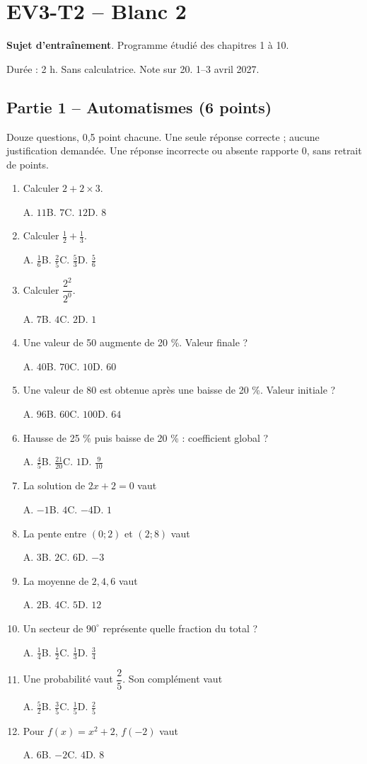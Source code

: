 \clearpage\section*{EV3-T2 -- Blanc 2}\label{EV3-T2}
\textbf{Sujet d’entraînement}. Programme étudié des chapitres 1 à 10.\par Durée : 2 h. Sans calculatrice. Note sur 20. 1–3 avril 2027.
\subsection*{Partie 1 -- Automatismes (6 points)}
Douze questions, 0,5 point chacune. Une seule réponse correcte ; aucune justification demandée. Une réponse incorrecte ou absente rapporte 0, sans retrait de points.
\begin{enumerate}
\item Calculer $2+2\times3$.\par A. $11$\quad B. $7$\quad C. $12$\quad D. $8$
\item Calculer $\frac12+\frac13$.\par A. $\frac{1}{6}$\quad B. $\frac{2}{5}$\quad C. $\frac{5}{3}$\quad D. $\frac{5}{6}$
\item Calculer $\dfrac{2^2}{2^{0}}$.\par A. $7$\quad B. $4$\quad C. $2$\quad D. $1$
\item Une valeur de 50 augmente de 20 \%. Valeur finale ?\par A. $40$\quad B. $70$\quad C. $10$\quad D. $60$
\item Une valeur de 80 est obtenue après une baisse de 20 \%. Valeur initiale ?\par A. $96$\quad B. $60$\quad C. $100$\quad D. $64$
\item Hausse de 25 \% puis baisse de 20 \% : coefficient global ?\par A. $\frac{4}{5}$\quad B. $\frac{21}{20}$\quad C. $1$\quad D. $\frac{9}{10}$
\item La solution de $2x+2=0$ vaut\par A. $-1$\quad B. $4$\quad C. $-4$\quad D. $1$
\item La pente entre $(0;2)$ et $(2;8)$ vaut\par A. $3$\quad B. $2$\quad C. $6$\quad D. $-3$
\item La moyenne de $2, 4, 6$ vaut\par A. $2$\quad B. $4$\quad C. $5$\quad D. $12$
\item Un secteur de $90^\circ$ représente quelle fraction du total ?\par A. $\frac{1}{4}$\quad B. $\frac{1}{2}$\quad C. $\frac{1}{3}$\quad D. $\frac{3}{4}$
\item Une probabilité vaut $\dfrac{2}{5}$. Son complément vaut\par A. $\frac{5}{2}$\quad B. $\frac{3}{5}$\quad C. $\frac{1}{5}$\quad D. $\frac{2}{5}$
\item Pour $f(x)=x^2+2$, $f(-2)$ vaut\par A. $6$\quad B. $-2$\quad C. $4$\quad D. $8$
\end{enumerate}
